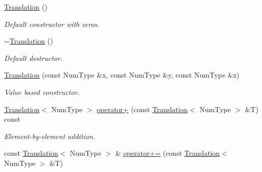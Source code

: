\begin{DoxyCompactItemize}
\item 
\hypertarget{singletonscrews_1_1_translation_ada9fcb3fd8eb8d09fb71b39680e31c57}{\hyperlink{singletonscrews_1_1_translation_ada9fcb3fd8eb8d09fb71b39680e31c57}{Translation} ()}\label{singletonscrews_1_1_translation_ada9fcb3fd8eb8d09fb71b39680e31c57}

\begin{DoxyCompactList}\small\item\em Default constructor with zeros. \end{DoxyCompactList}\item 
\hypertarget{singletonscrews_1_1_translation_aec2091d614ac6d70eeefd3371250bd13}{\hyperlink{singletonscrews_1_1_translation_aec2091d614ac6d70eeefd3371250bd13}{$\sim$\+Translation} ()}\label{singletonscrews_1_1_translation_aec2091d614ac6d70eeefd3371250bd13}

\begin{DoxyCompactList}\small\item\em Default destructor. \end{DoxyCompactList}\item 
\hyperlink{singletonscrews_1_1_translation_a456f1d54d0b8713df617b3bf74229aab}{Translation} (const Num\+Type \&x, const Num\+Type \&y, const Num\+Type \&z)
\begin{DoxyCompactList}\small\item\em Value based constructor. \end{DoxyCompactList}\item 
\hypertarget{singletonscrews_1_1_translation_adfd0282e085b38822e824418a1959f49}{\hyperlink{singletonscrews_1_1_translation}{Translation}$<$ Num\+Type $>$ \hyperlink{singletonscrews_1_1_translation_adfd0282e085b38822e824418a1959f49}{operator+} (const \hyperlink{singletonscrews_1_1_translation}{Translation}$<$ Num\+Type $>$ \&T) const }\label{singletonscrews_1_1_translation_adfd0282e085b38822e824418a1959f49}

\begin{DoxyCompactList}\small\item\em Element-\/by-\/element addition. \end{DoxyCompactList}\item 
\hypertarget{singletonscrews_1_1_translation_ab39d97fd84934f6949547e11b99a23e9}{const \hyperlink{singletonscrews_1_1_translation}{Translation}$<$ Num\+Type $>$ \& \hyperlink{singletonscrews_1_1_translation_ab39d97fd84934f6949547e11b99a23e9}{operator+=} (const \hyperlink{singletonscrews_1_1_translation}{Translation}$<$ Num\+Type $>$ \&T)}\label{singletonscrews_1_1_translation_ab39d97fd84934f6949547e11b99a23e9}


\end{DoxyCompactItemize}
